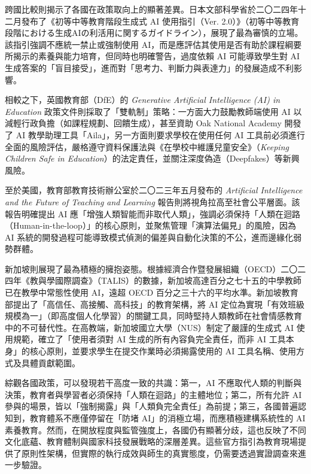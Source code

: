 跨國比較則揭示了各國在政策取向上的顯著差異。日本文部科學省於二〇二四年十二月發布了《初等中等教育階段生成式 AI 使用指引（Ver. 2.0）》（初等中等教育段階における生成AIの利活用に関するガイドライン），展現了最為審慎的立場\cite{mext2024genai}。該指引強調不應統一禁止或強制使用 AI，而是應評估其使用是否有助於課程綱要所揭示的素養與能力培育，但同時也明確警告，過度依賴 AI 可能導致學生對 AI 生成答案的「盲目接受」，進而對「思考力、判斷力與表達力」的發展造成不利影響\cite{mext2024genai}。

相較之下，英國教育部（DfE）的 \textit{Generative Artificial Intelligence (AI) in Education} 政策文件則採取了「雙軌制」策略：一方面大力鼓勵教師端使用 AI 以減輕行政負擔（如課程規劃、回饋生成），甚至資助 Oak National Academy 開發了 AI 教學助理工具「Aila」\cite{dfe2023genai}，另一方面則要求學校在使用任何 AI 工具前必須進行全面的風險評估，嚴格遵守資料保護法與《在學校中維護兒童安全》（\textit{Keeping Children Safe in Education}）的法定責任，並關注深度偽造（Deepfakes）等新興風險\cite{dfe2023genai}。

至於美國，教育部教育技術辦公室於二〇二三年五月發布的 \textit{Artificial Intelligence and the Future of Teaching and Learning} 報告則將視角拉高至社會公平層面\cite{usedu2023ai}。該報告明確提出 AI 應「增強人類智能而非取代人類」，強調必須保持「人類在迴路（Human-in-the-loop）」的核心原則，並聚焦管理「演算法偏見」的風險，因為 AI 系統的開發過程可能導致模式偵測的偏差與自動化決策的不公，進而邊緣化弱勢群體\cite{usedu2023ai}。

新加坡則展現了最為積極的擁抱姿態。根據經濟合作暨發展組織（OECD）二〇二四年《教與學國際調查》（TALIS）的數據，新加坡高達百分之七十五的中學教師已在教學中常態性使用 AI，遠超 OECD 百分之三十六的平均水準\cite{moe2025singapore}。新加坡教育部提出了「高信任、高接觸、高科技」的教育架構，將 AI 定位為實現「有效班級規模為一」（即高度個人化學習）的關鍵工具，同時堅持人類教師在社會情感教育中的不可替代性\cite{moe2025singapore}。在高教端，新加坡國立大學（NUS）制定了嚴謹的生成式 AI 使用規範，確立了「使用者須對 AI 生成的所有內容負完全責任，而非 AI 工具本身」的核心原則，並要求學生在提交作業時必須揭露使用的 AI 工具名稱、使用方式及具體貢獻範圍\cite{nus2024integrity}。

綜觀各國政策，可以發現若干高度一致的共識：第一，AI 不應取代人類的判斷與決策，教育者與學習者必須保持「人類在迴路」的主體地位；第二，所有允許 AI 參與的場景，皆以「強制揭露」與「人類負完全責任」為前提；第三，各國普遍認知到，教育體系不應僅停留在「防堵 AI」的消極立場，而應積極建構系統性的 AI 素養教育。然而，在開放程度與監管強度上，各國仍有顯著分歧，這也反映了不同文化底蘊、教育體制與國家科技發展戰略的深層差異。這些官方指引為教育現場提供了原則性架構，但實際的執行成效與師生的真實態度，仍需要透過實證調查來進一步驗證。

